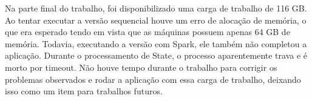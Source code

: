 Na parte final do trabalho, foi disponibilizado uma carga de trabalho de 116 
GB. Ao tentar executar a versão sequencial houve um erro de alocação de memória, 
o que era esperado tendo em vista que as máquinas possuem apenas 64 GB de 
memória. Todavia, executando a versão com Spark, ele também não completou a 
aplicação. Durante o processamento de State, o processo aparentemente trava e é 
morto por timeout. Não houve tempo durante o trabalho para corrigir os 
problemas observados e rodar a aplicação com essa carga de trabalho, deixando 
isso como um item para trabalhos futuros.
